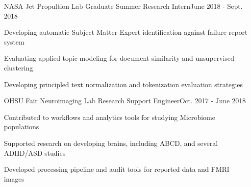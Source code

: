 \documentclass{article}
\newenvironment{**mylist}[2]{
  \subsubsection*{#1\hfill\small#2}
  \small
  \begin{list}{}{}
   \setlength{\topsep}{0pt}
   \setlength{\itemsep}{1pt}
   \setlength{\parskip}{0pt}
   \setlength{\parsep}{0pt}}{\end{list}\normalsize}
\newcommand{\LU}[1]{\hspace{-1em}{\bf Languages Used : #1}}
\begin{document}
\begin{comment}
\begin{**mylist}{Honors and Related Activities}{}
\item Comap Mathematical Modeling Competition (Meritorious Winner) - Top 10\%\hfill- Feb. 2012
\item Comap Mathematical Modeling Competition (Honorable Mention) { }- Top 30\%\hfill- Feb. 2011
\end{**mylist}
\end{comment}


\begin{**mylist}{NASA Jet Propultion Lab \tabb Graduate Summer Research Intern}{June 2018 - Sept. 2018}
\item Developing automatic  Subject Matter Expert identification against failure report system
\item Evaluating applied topic modeling for document similarity and unsupervised clustering
\item Developing principled text normalization and tokenization evaluation strategies
\item \LU{Python, gensim}
\end{**mylist}


\begin{**mylist}{OHSU Fair Neuroimaging Lab \tabb Research Support Engineer}{Oct. 2017 - June 2018}
\item Contributed to workflows and analytics tools for studying Microbiome populations
\item Supported research on developing brains, including ABCD, and several ADHD/ASD studies
\item Developed processing pipeline and audit tools for reported data and FMRI images
\item \LU{Python, Bash, R, neo4j, ponyorm, stan}
\end{**mylist}
\end{document}
